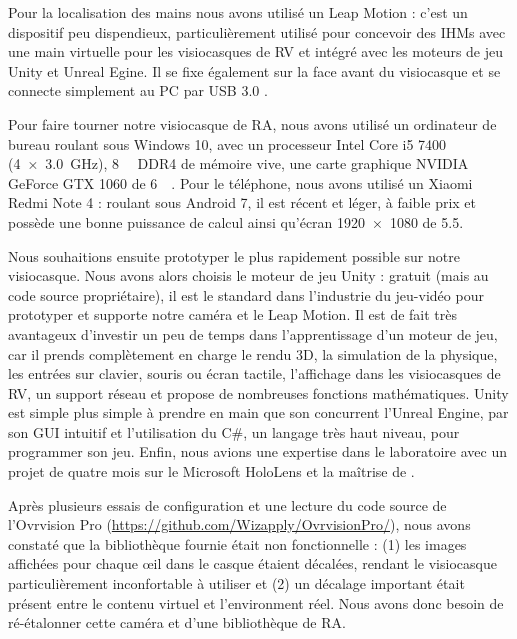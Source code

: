 
Pour la localisation des mains nous avons utilisé un Leap Motion : c'est un dispositif peu dispendieux, particulièrement utilisé pour concevoir des IHMs avec une main virtuelle pour les visiocasques de RV et intégré avec les moteurs de jeu Unity et Unreal Egine. Il se fixe également sur la face avant du visiocasque et se connecte simplement au PC par USB 3.0 .

Pour faire tourner notre visiocasque de RA, nous avons utilisé un ordinateur de bureau roulant sous Windows 10, avec un processeur Intel Core i5 7400 (\SI[product-units = single]{4x3.0}{\GHz}), \SI{8}{\giga\byte} DDR4 de mémoire vive, une carte graphique NVIDIA GeForce GTX 1060 de \SI{6}{\giga\byte}. Pour le téléphone, nous avons utilisé un Xiaomi Redmi Note 4 : roulant sous Android 7, il est récent et léger, à faible prix et possède une bonne puissance de calcul ainsi qu'écran \SI{1920x1080}{\px} de \SI{5.5}{\inch}.

Nous souhaitions ensuite prototyper le plus rapidement possible sur notre visiocasque. Nous avons alors choisis le moteur de jeu Unity : gratuit (mais au code source propriétaire), il est le standard dans l'industrie du jeu-vidéo pour prototyper et supporte notre caméra et le Leap Motion. Il est de fait très avantageux d'investir un peu de temps dans l'apprentissage d'un moteur de jeu, car il prends complètement en charge le rendu 3D, la simulation de la physique, les entrées sur clavier, souris ou écran tactile, l'affichage dans les visiocasques de RV, un support réseau et propose de nombreuses fonctions mathématiques. Unity est simple plus simple à prendre en main que son concurrent l'Unreal Engine, par son GUI intuitif et l'utilisation du C\#, un langage très haut niveau, pour programmer son jeu. Enfin, nous avions une expertise dans le laboratoire avec un projet de quatre mois sur le Microsoft HoloLens et la maîtrise de \cite{Millette2016}.

Après plusieurs essais de configuration et une lecture du code source de l'Ovrvision Pro (\url{https://github.com/Wizapply/OvrvisionPro/}), nous avons constaté que la bibliothèque fournie était non fonctionnelle : (1) les images affichées pour chaque \oe il dans le casque étaient décalées, rendant le visiocasque particulièrement inconfortable à utiliser et (2) un décalage important était présent entre le contenu virtuel et l'environment réel. Nous avons donc besoin de ré-étalonner cette caméra et d'une bibliothèque de RA.

